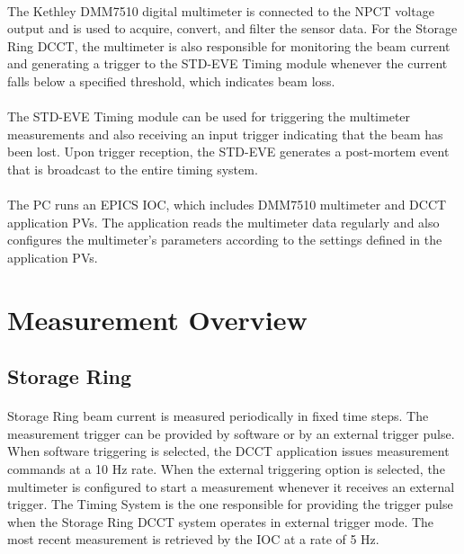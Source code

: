 \documentclass[openany]{article}
\begin{document}
	\paragraph{} The Kethley DMM7510 digital multimeter is connected to the NPCT voltage output and is used to acquire, convert, and filter the sensor data. For the Storage Ring DCCT, the multimeter is also responsible for monitoring the beam current and generating a trigger to the STD-EVE Timing module whenever the current falls below a specified threshold, which indicates beam loss.

	\paragraph{} The STD-EVE Timing module can be used for triggering the multimeter measurements and also receiving an input trigger indicating that the beam has been lost. Upon trigger reception, the STD-EVE generates a post-mortem event that is broadcast to the entire timing system.

	\paragraph{} The PC runs an EPICS IOC, which includes DMM7510 multimeter and DCCT application PVs. The application reads the multimeter data regularly and also configures the multimeter's parameters according to the settings defined in the application PVs.

\section{Measurement Overview}

	\subsection{Storage Ring} 

		\paragraph{} Storage Ring beam current is measured periodically in fixed time steps. The measurement trigger can be provided by software or by an external trigger pulse. When software triggering is selected, the DCCT application issues measurement commands at a 10 Hz rate. When the external triggering option is selected, the multimeter is configured to start a measurement whenever it receives an external trigger. The Timing System is the one responsible for providing the trigger pulse when the Storage Ring DCCT system operates in external trigger mode. The most recent measurement is retrieved by the IOC at a rate of 5 Hz.
\end{document}
